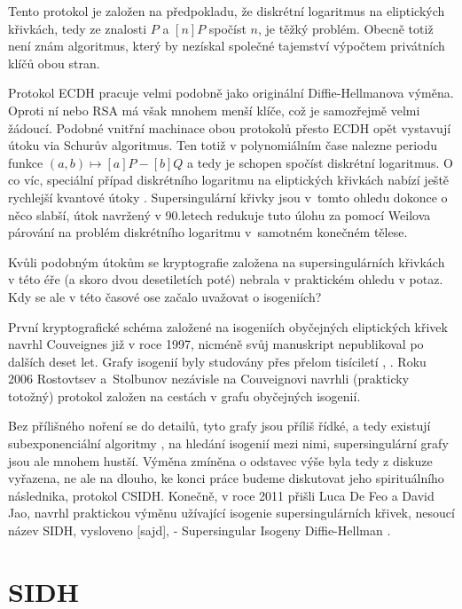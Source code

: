 \documentclass[12pt]{report}
\begin{document}
Tento protokol je založen na předpokladu, že diskrétní logaritmus na eliptických křivkách, tedy ze znalosti $P$ a $[n]P$ spočíst $n$, je těžký problém. Obecně totiž není znám algoritmus, který by nezískal společné tajemství výpočtem privátních klíčů obou stran.

Protokol ECDH pracuje velmi podobně jako originální Diffie-Hellmanova výměna. Oproti ní nebo RSA má však mnohem menší klíče, což je samozřejmě velmi žádoucí. Podobné vnitřní machinace obou protokolů přesto ECDH opět vystavují útoku via Schurův algoritmus. Ten totiž v polynomiálním čase nalezne periodu funkce $(a,b) \mapsto [a]P - [b]Q$ a tedy je schopen spočíst diskrétní logaritmus. O co víc, speciální případ diskrétního logaritmu na eliptických křivkách nabízí ještě rychlejší kvantové útoky \cite{Proos}. Supersingulární křivky jsou v~tomto ohledu dokonce o něco slabší, útok navržený v 90.letech \cite{MOV} redukuje tuto úlohu za pomocí Weilova párování na problém diskrétního logaritmu v~samotném konečném tělese.

Kvůli podobným útokům se kryptografie založena na supersingulárních křivkách v této éře (a skoro dvou desetiletích poté) nebrala v praktickém ohledu v potaz. Kdy se ale v této časové ose začalo uvažovat o isogeniích?

První kryptografické schéma založené na isogeniích obyčejných eliptických křivek navrhl Couveignes \cite{Couveignes} již v roce 1997, nicméně svůj manuskript nepublikoval po dalších deset let. Grafy isogenií byly studovány přes přelom tisíciletí \cite{Galbraith}, \cite{Galbraith2}. Roku 2006 Rostovtsev a~Stolbunov \cite{Stolbunov} nezávisle na Couveignovi navrhli (prakticky totožný) protokol založen na cestách v grafu obyčejných isogenií. 

Bez přílišného noření se do detailů, tyto grafy jsou příliš řídké, a tedy existují subexponenciální algoritmy \cite{Galbraith3}, \cite{Childs} na hledání isogenií mezi nimi, supersingulární grafy jsou ale mnohem hustší. Výměna zmíněna o odstavec výše byla tedy z diskuze vyřazena, ne ale na dlouho, ke konci práce budeme diskutovat jeho spirituálního následnika, protokol CSIDH. Konečně, v roce 2011 přišli Luca De Feo a David Jao, navrhl praktickou výměnu užívající isogenie supersingulárních křivek, nesoucí název SIDH, vysloveno [sajd], - Supersingular Isogeny Diffie-Hellman \cite{DeFeo3}.

\section{SIDH}
\end{document}
